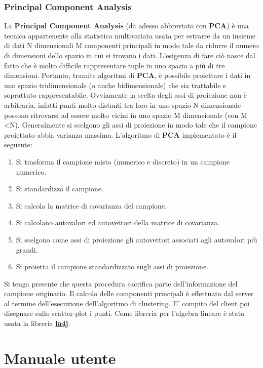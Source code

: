 \documentclass{article}
\begin{document}
	\subsubsection{Principal Component Analysis}
	La \textbf{Principal Component Analysis} (da adesso abbreviato con
	\textbf{PCA}) è una tecnica appartenente alla statistica multivariata
	usata per estrarre da un insieme di dati N dimensionali M componenti
	principali in modo tale da ridurre il numero di dimensioni dello spazio
	in cui si trovano i dati. L'esigenza di fare ciò nasce dal fatto che è
	molto difficile rappresentare tuple in uno spazio a più di tre
	dimensioni. Pertanto, tramite algoritmi di \textbf{PCA}, è possibile
	proiettare i dati in uno spazio tridimensionale (o anche bidimensionale)
	che sia trattabile e soprattuto rappresentabile. Ovviamente la scelta
	degli assi di proiezione non è arbitraria, infatti punti molto distanti
	tra loro in uno spazio N dimensionale possono ritrovarsi ad essere molto
	vicini in uno spazio M dimensionale (con M \textless N). Generalmente
	si scelgono gli assi di proiezione in modo tale che il campione
	proiettato abbia varianza massima. L'algoritmo di \textbf{PCA}
	implementato è il seguente:
	\begin{enumerate}
		\item Si trasforma il campione misto (numerico e discreto) in
		un campione numerico.
		\item Si standardizza il campione.
		\item Si calcola la matrice di covarianza del campione.
		\item Si calcolano autovalori ed autovettori della matrice di
		covarianza.
		\item Si scelgono come assi di proiezione gli autovettori
		associati agli autovalori più grandi.
		\item Si proietta il campione standardizzato sugli assi di
		proiezione.
	\end{enumerate}
	Si tenga presente che questa procedura sacrifica parte dell'informazione
	del campione originario. Il calcolo delle componenti principali è
	effettuato dal server al termine dell'esecuzione dell'algoritmo di
	clustering. E' compito del client poi disegnare sullo scatter-plot
	i punti. Come libreria per l'algebra lineare è stata usata la libreria
	\href{http://la4j.org}{\textbf{la4j}}.

	\section{Manuale utente}
\end{document}
